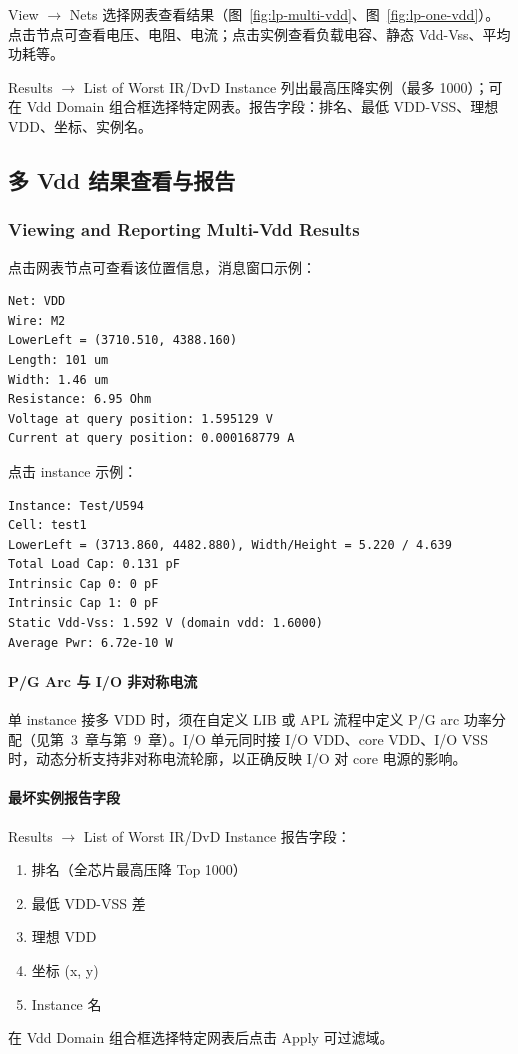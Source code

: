 View $\rightarrow$ Nets 选择网表查看结果（图~\ref{fig:lp-multi-vdd}、图~\ref{fig:lp-one-vdd}）。点击节点可查看电压、电阻、电流；点击实例查看负载电容、静态 Vdd-Vss、平均功耗等。





Results $\rightarrow$ List of Worst IR/DvD Instance 列出最高压降实例（最多 1000）；可在 Vdd Domain 组合框选择特定网表。报告字段：排名、最低 VDD-VSS、理想 VDD、坐标、实例名。
\subsection{多 Vdd 结果查看与报告}
\subsubsection*{Viewing and Reporting Multi-Vdd Results}

点击网表节点可查看该位置信息，消息窗口示例：
\begin{lstlisting}
Net: VDD
Wire: M2
LowerLeft = (3710.510, 4388.160)
Length: 101 um
Width: 1.46 um
Resistance: 6.95 Ohm
Voltage at query position: 1.595129 V
Current at query position: 0.000168779 A
\end{lstlisting}

点击 instance 示例：
\begin{lstlisting}
Instance: Test/U594
Cell: test1
LowerLeft = (3713.860, 4482.880), Width/Height = 5.220 / 4.639
Total Load Cap: 0.131 pF
Intrinsic Cap 0: 0 pF
Intrinsic Cap 1: 0 pF
Static Vdd-Vss: 1.592 V (domain vdd: 1.6000)
Average Pwr: 6.72e-10 W
\end{lstlisting}

\paragraph{P/G Arc 与 I/O 非对称电流}
单 instance 接多 VDD 时，须在自定义 LIB 或 APL 流程中定义 P/G arc 功率分配（见第~3~章与第~9~章）。I/O 单元同时接 I/O VDD、core VDD、I/O VSS 时，动态分析支持非对称电流轮廓，以正确反映 I/O 对 core 电源的影响。

\paragraph{最坏实例报告字段}
Results $\rightarrow$ List of Worst IR/DvD Instance 报告字段：
\begin{enumerate}
  \item 排名（全芯片最高压降 Top 1000）
  \item 最低 VDD-VSS 差
  \item 理想 VDD
  \item 坐标 (x, y)
  \item Instance 名
\end{enumerate}
在 Vdd Domain 组合框选择特定网表后点击 Apply 可过滤域。


